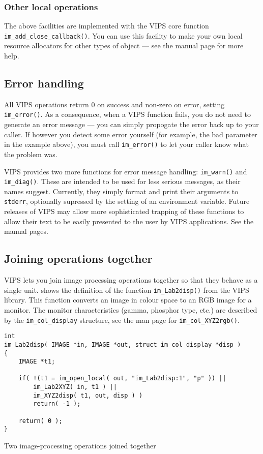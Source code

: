 \subsubsection{Other local operations}

The above facilities are implemented with the VIPS core function
\verb+im_add_close_callback()+. You can use this facility to make your own
local resource allocators for other types of object --- see the manual page
for more help.

\subsection{Error handling}

All VIPS operations return 0 on success and non-zero on error, setting
\verb+im_error()+. As a consequence, when a VIPS function fails, you do not
need to generate an error message --- you can simply propogate the error back
up to your caller. If however you detect some error yourself (for example,
the bad parameter in the example above), you must call \verb+im_error()+
to let your caller know what the problem was.

VIPS provides two more functions for error message handling: \verb+im_warn()+
and \verb+im_diag()+. These are intended to be used for less serious
messages, as their names suggest. Currently, they simply format and print
their arguments to \verb+stderr+, optionally supressed by the setting of an
environment variable. Future releases of VIPS may allow more sophisticated
trapping of these functions to allow their text to be easily presented to
the user by VIPS applications. See the manual pages.

\subsection{Joining operations together}
\label{sec:joinup}

VIPS lets you join image processing operations together so that they
behave as a single unit.  shows the definition of the
function \verb+im_Lab2disp()+ from the VIPS library. This function converts
an image in \cielab{} colour space to an RGB image for a monitor. The
monitor characteristics (gamma, phosphor type, etc.) are described by the
\verb+im_col_display+ structure, see the man page for \verb+im_col_XYZ2rgb()+.

\begin{fig2}
\begin{verbatim}
int 
im_Lab2disp( IMAGE *in, IMAGE *out, struct im_col_display *disp )
{	
    IMAGE *t1;

    if( !(t1 = im_open_local( out, "im_Lab2disp:1", "p" )) ||
        im_Lab2XYZ( in, t1 ) ||
        im_XYZ2disp( t1, out, disp ) )
        return( -1 );

    return( 0 );
}
\end{verbatim}
\caption{Two image-processing operations joined together}
\label{fg:join}
\end{fig2}

